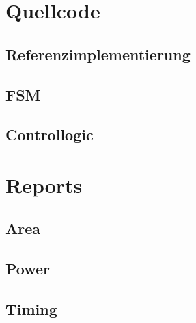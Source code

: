 \documentclass[fontsize=12pt,paper=a4,ngerman]{scrarticle}
\begin{document}
\clearpage
\begin{appendices}
	\begingroup
	\let\clearpage\relax%
	\section{Quellcode}
	\subsection{Referenzimplementierung}\label{appendix:Referenzimplementierung}
	
	\subsection{FSM}\label{appendix:fsm}
	\subsection{Controllogic}\label{appendix:controllogic}
	\endgroup %

	\clearpage

	\begingroup
	\let\clearpage\relax%
	\section{Reports}\label{appendix:reports}
	\subsection{Area}
	\subsection{Power}
	\subsection{Timing}
	\endgroup %
\end{appendices}

\clearpage
\printbibliography
\end{document}
